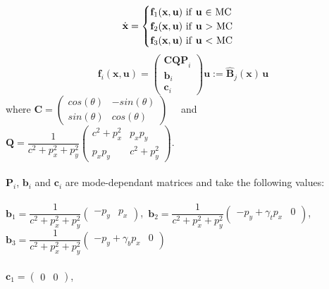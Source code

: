 \documentclass[12,twoside]{TFG-GM}
\theoremstyle{definition}
\theoremstyle{remark}
\begin{document}
\begin{equation} \label{eq:motion_equation}
\dot{\textbf{x}} = \begin{cases}
					\textbf{f}_1(\textbf{x}, \textbf{u}) \,\, \text{if \textbf{u} $\in$ MC} \\
					\textbf{f}_2(\textbf{x}, \textbf{u}) \,\, \text{if \textbf{u} $>$ MC} \\
					\textbf{f}_3(\textbf{x}, \textbf{u}) \,\, \text{if \textbf{u} $<$ MC}
\end{cases}
\end{equation}
\begin{equation}
\textbf{f}_i(\textbf{x}, \textbf{u}) = 
\begin{pmatrix} 
	\textbf{CQP}_i \\ 
	\textbf{b}_i \\
	\textbf{c}_i 
\end{pmatrix} \textbf{u} := \hat{\textbf{B}}_j(\textbf{x})\, \textbf{u}
\end{equation}
where 
$\textbf{C} = \begin{pmatrix} 
cos(\theta) & -sin(\theta) \\
sin(\theta) & cos(\theta)
\end{pmatrix}
$ \,\,\,\, and  \,\,\,\,
$\textbf{Q} = \dfrac{1}{c^2 + p_x^2 + p_y^2} \begin{pmatrix} 
c^2 + p_x^2 & p_x p_y \\
p_x p_y & c^2 + p_y^2
\end{pmatrix}$. \\ \\
$\textbf{P}_i$, $\textbf{b}_i$ and $\textbf{c}_i$ are mode-dependant matrices and take the following values: \\ \\
$\textbf{b}_1 = \dfrac{1}{c^2 + p_x^2 + p_y^2} \begin{pmatrix} -p_y & p_x \end{pmatrix}$, \,$\textbf{b}_2 = \dfrac{1}{c^2 + p_x^2 + p_y^2} \begin{pmatrix} -p_y + \gamma_t p_x & 0 \end{pmatrix}$, \,$\textbf{b}_3 = \dfrac{1}{c^2 + p_x^2 + p_y^2} \begin{pmatrix} -p_y + \gamma_b p_x & 0 \end{pmatrix}$ \\ \\
$\textbf{c}_1 = \begin{pmatrix}
0 & 0
\end{pmatrix}$,\,\,\,\,\,\,\,\,\,\,\,\,\,\,\,\,\,\,\,\,\,\,\,\,\,\,\,\,\,\,\,\,\,\,\,\,\,\,\,\,\,\,\,\,\,\,
\end{document}
